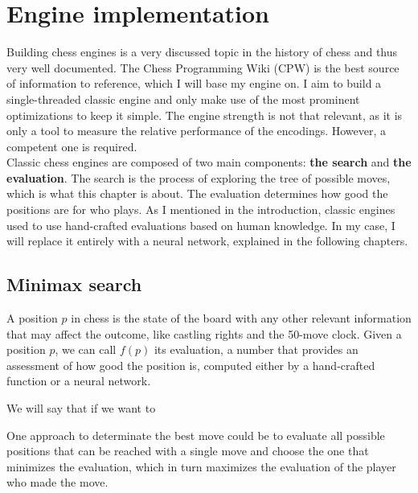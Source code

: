 \section{Engine implementation}

Building chess engines is a very discussed topic in the history of chess and thus very well documented. The Chess Programming Wiki (CPW) \cite{cpw} is the best source of information to reference, which I will base my engine on. I aim to build a single-threaded classic engine and only make use of the most prominent optimizations to keep it simple. The engine strength is not that relevant, as it is only a tool to measure the relative performance of the encodings. However, a competent one is required. \\

Classic chess engines are composed of two main components: \textbf{the search} and \textbf{the evaluation}. The search is the process of exploring the tree of possible moves, which is what this chapter is about. The evaluation determines how good the positions are for who plays. As I mentioned in the introduction, classic engines used to use hand-crafted evaluations based on human knowledge. In my case, I will replace it entirely with a neural network, explained in the following chapters.

\subsection{Minimax search}

A position $p$ in chess is the state of the board with any other relevant information that may affect the outcome, like castling rights and the 50-move clock. Given a position $p$, we can call $f(p)$ its evaluation, a number that provides an assessment of how good the position is, computed either by a hand-crafted function or a neural network.



We will say that if we want to 


One approach to determinate the best move could be to evaluate all possible positions that can be reached with a single move and choose the one that minimizes the evaluation, which in turn maximizes the evaluation of the player who made the move.

